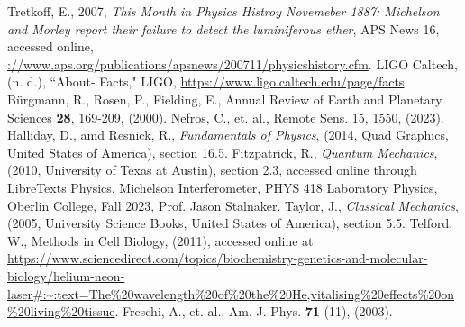 \documentclass[11pt,letterpaper]{article}
\begin{document}
\begin{thebibliography}{99}
 Tretkoff, E., 2007, \textit{This Month in Physics Histroy Novemeber 1887: Michelson and Morley report their failure to detect the luminiferous ether}, APS News 16, accessed online, \url{://www.aps.org/publications/apsnews/200711/physicshistory.cfm}.
 LIGO Caltech, (n. d.), ``About- Facts," LIGO, \url{https://www.ligo.caltech.edu/page/facts}.
 Bürgmann, R., Rosen, P., Fielding, E., Annual Review of Earth and Planetary Sciences \textbf{28}, 169-209, (2000).
 Nefros, C., et. al., Remote Sens. 15, 1550, (2023).
 Halliday, D., amd Resnick, R., \textit{Fundamentals of Physics}, (2014, Quad Graphics, United States of America), section 16.5.
 Fitzpatrick, R., \textit{Quantum Mechanics}, (2010, University of Texas at Austin), section 2.3, accessed online through LibreTexts Physics.
 Michelson Interferometer, PHYS 418 Laboratory Physics, Oberlin College, Fall 2023, Prof. Jason Stalnaker.
 Taylor, J., \textit{Classical Mechanics}, (2005, University Science Books, United States of America), section 5.5.
 Telford, W., Methods in Cell Biology, (2011), accessed online at \url{https://www.sciencedirect.com/topics/biochemistry-genetics-and-molecular-biology/helium-neon-laser#:~:text=The\%20wavelength\%20of\%20the\%20He,vitalising\%20effects\%20on\%20living\%20tissue}.
 Freschi, A., et. al., Am. J. Phys. \textbf{71} (11), (2003).

\end{thebibliography}
\end{document}
